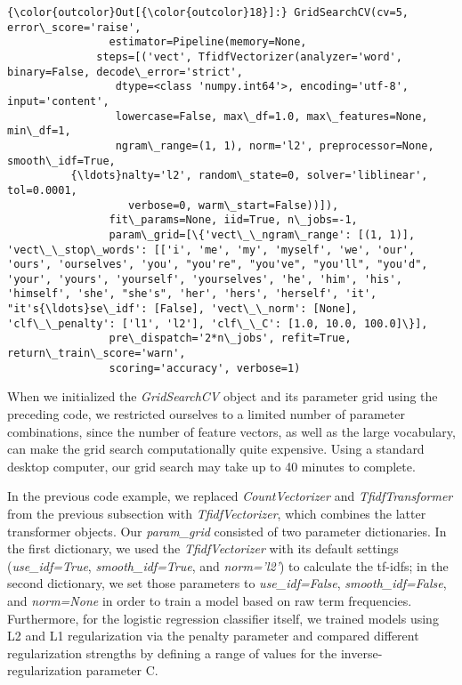 \documentclass[11pt]{article}
\begin{document}
\begin{Verbatim}[commandchars=\\\{\}]
{\color{outcolor}Out[{\color{outcolor}18}]:} GridSearchCV(cv=5, error\_score='raise',
                estimator=Pipeline(memory=None,
              steps=[('vect', TfidfVectorizer(analyzer='word', binary=False, decode\_error='strict',
                 dtype=<class 'numpy.int64'>, encoding='utf-8', input='content',
                 lowercase=False, max\_df=1.0, max\_features=None, min\_df=1,
                 ngram\_range=(1, 1), norm='l2', preprocessor=None, smooth\_idf=True,
          {\ldots}nalty='l2', random\_state=0, solver='liblinear', tol=0.0001,
                   verbose=0, warm\_start=False))]),
                fit\_params=None, iid=True, n\_jobs=-1,
                param\_grid=[\{'vect\_\_ngram\_range': [(1, 1)], 'vect\_\_stop\_words': [['i', 'me', 'my', 'myself', 'we', 'our', 'ours', 'ourselves', 'you', "you're", "you've", "you'll", "you'd", 'your', 'yours', 'yourself', 'yourselves', 'he', 'him', 'his', 'himself', 'she', "she's", 'her', 'hers', 'herself', 'it', "it's{\ldots}se\_idf': [False], 'vect\_\_norm': [None], 'clf\_\_penalty': ['l1', 'l2'], 'clf\_\_C': [1.0, 10.0, 100.0]\}],
                pre\_dispatch='2*n\_jobs', refit=True, return\_train\_score='warn',
                scoring='accuracy', verbose=1)
\end{Verbatim}
            
    When we initialized the \emph{GridSearchCV} object and its parameter
grid using the preceding code, we restricted ourselves to a limited
number of parameter combinations, since the number of feature vectors,
as well as the large vocabulary, can make the grid search
computationally quite expensive. Using a standard desktop computer, our
grid search may take up to 40 minutes to complete.

In the previous code example, we replaced \emph{CountVectorizer} and
\emph{TfidfTransformer} from the previous subsection with
\emph{TfidfVectorizer}, which combines the latter transformer objects.
Our \emph{param\_grid} consisted of two parameter dictionaries. In the
first dictionary, we used the \emph{TfidfVectorizer} with its default
settings (\emph{use\_idf=True}, \emph{smooth\_idf=True}, and
\emph{norm='l2'}) to calculate the tf-idfs; in the second dictionary, we
set those parameters to \emph{use\_idf=False}, \emph{smooth\_idf=False},
and \emph{norm=None} in order to train a model based on raw term
frequencies. Furthermore, for the logistic regression classifier itself,
we trained models using L2 and L1 regularization via the penalty
parameter and compared different regularization strengths by defining a
range of values for the inverse-regularization parameter C.
\end{document}
